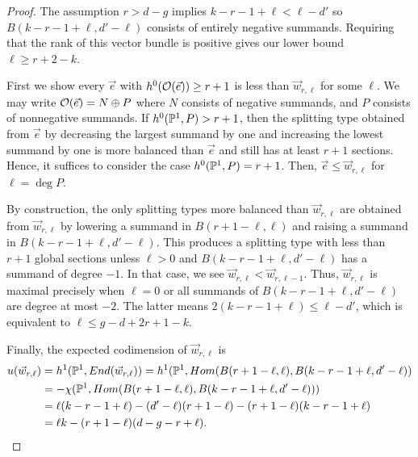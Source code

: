 \begin{proof}
The assumption $r > d - g$ implies $k - r - 1 + \ell < \ell - d'$ so $B(k-r-1+\ell, d'-\ell)$ consists of entirely negative summands.
Requiring that the rank of this vector bundle is positive gives our lower bound $\ell \geq r + 2 - k$.



First we show every $\vec{e}$ with $h^0(\mathcal{O}(\vec{e})) \geq r+1$ is less than $\vec{w}_{r,\ell}$ for some $\ell$.
We may write $\mathcal{O}(\vec{e}) = N \oplus P$ where $N$ consists of negative summands, and $P$ consists of nonnegative summands. If $h^0(\mathbb{P}^1, P) > r + 1$, then the splitting type obtained from $\vec{e}$ by decreasing the largest summand by one and increasing the lowest summand by one is more balanced than $\vec{e}$ and still has at least $r+1$ sections. Hence, it suffices to consider the case $h^0(\mathbb{P}^1, P) = r +1$. Then, $\vec{e} \leq \vec{w}_{r,\ell}$ for $\ell = \deg P$.

By construction, the only splitting types more balanced than $\vec{w}_{r,\ell}$ are obtained from $\vec{w}_{r,\ell}$ by lowering a summand in $B(r+1 - \ell, \ell)$ and raising a summand in $B(k-r-1+\ell, d'-\ell) $. This produces a splitting type with less than $r+1$ global sections unless $\ell > 0$ and $B(k-r-1+\ell, d'-\ell)$ has a summand of degree $-1$. In that case, we see $\vec{w}_{r,\ell} < \vec{w}_{r, \ell-1}$. Thus, $\vec{w}_{r,\ell}$ is maximal precisely when $\ell = 0$ or all summands of $B(k-r-1+\ell, d'-\ell)$ are degree at most $-2$. The latter means
$2(k - r - 1 + \ell) \leq \ell - d'$, which is equivalent to $\ell \leq g - d + 2r + 1 - k$.

Finally, the expected codimension of $\vec{w}_{r,\ell}$ is
\begin{align*}
u(\vec{w}_{r,\ell}) &= h^1(\mathbb{P}^1, End(\vec{w}_{r,\ell})) = h^1(\mathbb{P}^1, Hom(B(r+1 - \ell, \ell), B(k - r - 1 + \ell, d' - \ell)) \\
&= - \chi(\mathbb{P}^1, Hom(B(r+1 - \ell, \ell), B(k - r - 1 + \ell, d' - \ell)))\\
&= \ell(k - r - 1 + \ell) - (d' - \ell)(r+1 - \ell) - (r + 1 - \ell)(k - r - 1 + \ell) \\
&= \ell k -(r + 1 - \ell)( d -g - r + \ell). \qedhere
\end{align*}
\end{proof}

